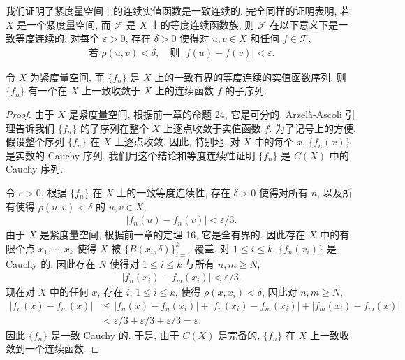 \documentclass[../../main.tex]{subfiles}
\begin{document}
我们证明了紧度量空间上的连续实值函数是一致连续的. 完全同样的证明表明, 若 $X$ 是一个紧度量空间, 而 $\mathcal{F}$ 是 $X$ 上的等度连续函数族, 则 $\mathcal{F}$ 在以下意义下是一致等度连续的: 对每个 $\varepsilon>0$, 存在 $\delta>0$ 使得对 $u,v\in X$ 和任何 $f\in\mathcal{F}$,
\begin{align*}
\text{若 }\rho(u,v)<\delta,\quad\text{则 }|f(u)-f(v)|<\varepsilon.
\end{align*}

\begin{theorem}\label{theorem:ch10-arzela-ascoli}
令 $X$ 为紧度量空间, 而 $\{f_{n}\}$ 是 $X$ 上的一致有界的等度连续的实值函数序列. 则 $\{f_{n}\}$ 有一个在 $X$ 上一致收敛于 $X$ 上的连续函数 $f$ 的子序列.
\end{theorem}

\begin{proof}
由于 $X$ 是紧度量空间, 根据前一章的命题 24, 它是可分的. Arzel\`a-Ascoli 引理告诉我们 $\{f_{n}\}$ 的子序列在整个 $X$ 上逐点收敛于实值函数 $f$. 为了记号上的方便, 假设整个序列 $\{f_{n}\}$ 在 $X$ 上逐点收敛. 因此, 特别地, 对 $X$ 中的每个 $x$, $\{f_{n}(x)\}$ 是实数的 Cauchy 序列. 我们用这个结论和等度连续性证明 $\{f_{n}\}$ 是 $C(X)$ 中的 Cauchy 序列.

令 $\varepsilon>0$. 根据 $\{f_{n}\}$ 在 $X$ 上的一致等度连续性, 存在 $\delta>0$ 使得对所有 $n$, 以及所有使得 $\rho(u,v)<\delta$ 的 $u,v\in X$,
\begin{align}
|f_{n}(u)-f_{n}(v)|<\varepsilon/3.\label{align:ch10-arzela-1}
\end{align}
由于 $X$ 是紧度量空间, 根据前一章的定理 16, 它是全有界的. 因此存在 $X$ 中的有限个点 $x_{1},\cdots,x_{k}$ 使得 $X$ 被 $\{B(x_{i},\delta)\}_{i=1}^{k}$ 覆盖. 对 $1\leqslant i\leqslant k$, $\{f_{n}(x_{i})\}$ 是 Cauchy 的, 因此存在 $N$ 使得对 $1\leqslant i\leqslant k$ 与所有 $n,m\geqslant N$,
\begin{align}
|f_{n}(x_{i})-f_{m}(x_{i})|<\varepsilon/3.\label{align:ch10-arzela-2}
\end{align}
现在对 $X$ 中的任何 $x$, 存在 $i$, $1\leqslant i\leqslant k$, 使得 $\rho(x,x_{i})<\delta$, 因此对 $n,m\geqslant N$,
\begin{align*}
|f_{n}(x)-f_{m}(x)|&\leqslant|f_{n}(x)-f_{n}(x_{i})|+|f_{n}(x_{i})-f_{m}(x_{i})|+|f_{m}(x_{i})-f_{m}(x)|\\
&<\varepsilon/3+\varepsilon/3+\varepsilon/3=\varepsilon.
\end{align*}
因此 $\{f_{n}\}$ 是一致 Cauchy 的. 于是, 由于 $C(X)$ 是完备的, $\{f_{n}\}$ 在 $X$ 上一致收敛到一个连续函数.
\end{proof}
\end{document}
